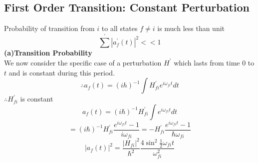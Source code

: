\subsection{First Order Transition: Constant Perturbation }
Probability of transition from $i $ to all states $f\neq i$ is much less than unit
$$ \sum^\prime|a^\prime_f(t)|^2<<1$$
\textbf{(a)\quad Transition Probability }\\
We now consider the specific case of a perturbation $H^\prime$ which lasts from time $0  $ to $t$ and is constant during this period.\\
$$\therefore a_f(t)=(ih)^{-1}\int H^\prime _{fi}e^{i\omega_{fi}t}dt $$ 
$\therefore H^\prime_{fi}$ is constant\\
$$a_f(t)=(i\hbar)^{-1}H^\prime_{fi}\int e^{i\omega_{fi}t}dt$$
$$=(i\hbar)^{-1}H^\prime_{fi}\frac{e^{i\omega_{fi}t}-1}{i\omega_{fi}}=-H^\prime_{fi}\frac{e^{i\omega_{fi}t}-1}{\hbar\omega_{fi}}$$
$$|a_f(t)|^2=\frac{|H_{fi}|^2}{\hbar^2}\frac{4\sin^2\frac{1}{2}\omega_{fi}t}{\omega_{fi}^2}$$

